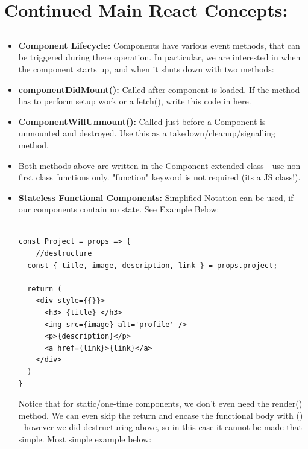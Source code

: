 \documentclass[8pt,a4paper]{extarticle}
\begin{document}
\section{Continued Main React Concepts:}

\subsection{}

\subsubsection{}

\begin{itemize}
\item \textbf{Component Lifecycle:} Components have various event methods, that can be triggered during there operation. In particular, we are interested in when the component starts up, and when it shuts down with two methods:
\item \textbf{componentDidMount():} Called after component is loaded. If the method has to perform setup work or a fetch(), write this code in here.
\item \textbf{ComponentWillUnmount():} Called just before a Component is unmounted and destroyed. Use this as a takedown/cleanup/signalling method.
\item Both methods above are written in the Component extended class - use non-first class functions only. "function" keyword is not required (its a JS class!).
\item \textbf{Stateless Functional Components:} Simplified Notation can be used, if our components contain no state. See Example Below:

\begin{verbatim}

const Project = props => {
	//destructure
  const { title, image, description, link } = props.project;
 
  return (
    <div style={{}}>
      <h3> {title} </h3>
      <img src={image} alt='profile' />
      <p>{description}</p>
      <a href={link}>{link}</a>
    </div>
  )
}
\end{verbatim}

Notice that for static/one-time components, we don't even need the render() method. We can even skip the return and encase the functional body with () - however we did destructuring above, so in this case it cannot be made that simple. Most simple example below:


\end{itemize}
\end{document}
